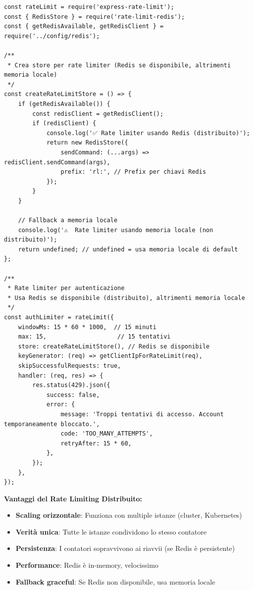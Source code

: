 \documentclass[11pt,a4paper]{article}
\begin{document}
\begin{lstlisting}[caption=Rate Limiter con Redis Store]
const rateLimit = require('express-rate-limit');
const { RedisStore } = require('rate-limit-redis');
const { getRedisAvailable, getRedisClient } = require('../config/redis');

/**
 * Crea store per rate limiter (Redis se disponibile, altrimenti memoria locale)
 */
const createRateLimitStore = () => {
    if (getRedisAvailable()) {
        const redisClient = getRedisClient();
        if (redisClient) {
            console.log('✅ Rate limiter usando Redis (distribuito)');
            return new RedisStore({
                sendCommand: (...args) => redisClient.sendCommand(args),
                prefix: 'rl:', // Prefix per chiavi Redis
            });
        }
    }
    
    // Fallback a memoria locale
    console.log('⚠️  Rate limiter usando memoria locale (non distribuito)');
    return undefined; // undefined = usa memoria locale di default
};

/**
 * Rate limiter per autenticazione
 * Usa Redis se disponibile (distribuito), altrimenti memoria locale
 */
const authLimiter = rateLimit({
    windowMs: 15 * 60 * 1000,  // 15 minuti
    max: 15,                    // 15 tentativi
    store: createRateLimitStore(), // Redis se disponibile
    keyGenerator: (req) => getClientIpForRateLimit(req),
    skipSuccessfulRequests: true,
    handler: (req, res) => {
        res.status(429).json({
            success: false,
            error: {
                message: 'Troppi tentativi di accesso. Account temporaneamente bloccato.',
                code: 'TOO_MANY_ATTEMPTS',
                retryAfter: 15 * 60,
            },
        });
    },
});
\end{lstlisting}

\textbf{Vantaggi del Rate Limiting Distribuito:}
\begin{itemize}
    \item \textbf{Scaling orizzontale}: Funziona con multiple istanze (cluster, Kubernetes)
    \item \textbf{Verità unica}: Tutte le istanze condividono lo stesso contatore
    \item \textbf{Persistenza}: I contatori sopravvivono ai riavvii (se Redis è persistente)
    \item \textbf{Performance}: Redis è in-memory, velocissimo
    \item \textbf{Fallback graceful}: Se Redis non disponibile, usa memoria locale
\end{itemize}
\end{document}
